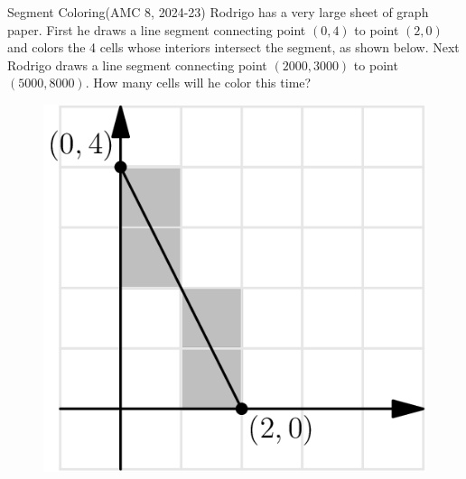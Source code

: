 \documentclass{beamer}
\theoremstyle{definition}
\begin{document}
\begin{frame}{Segment Coloring(AMC 8, 2024-23)}
    Rodrigo has a very large sheet of graph paper. First he draws a line segment connecting point $(0,4)$ to point $(2,0)$ and colors the 4 cells whose interiors intersect the segment, as shown below. Next Rodrigo draws a line segment connecting point $(2000,3000)$ to point $(5000,8000)$.
    How many cells will he color this time?
    \begin{figure}
        \includegraphics[height=0.5\textheight]{color the cell.png}
    \end{figure}
\end{frame}
\end{document}
